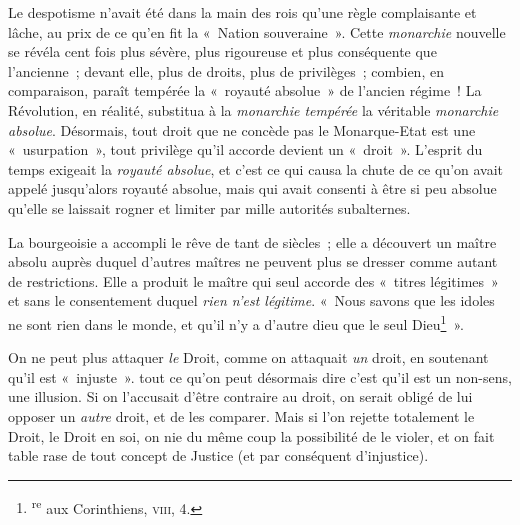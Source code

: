 \documentclass[french,twoside]{book} %
\begin{document}
Le despotisme n’avait été dans la main des rois qu’une règle complaisante et lâche, au prix de ce qu’en fit la « Nation souveraine ». Cette \emph{monarchie} nouvelle se révéla cent fois plus sévère, plus rigoureuse et plus conséquente que l’ancienne ; devant elle, plus de droits, plus de privilèges ; combien, en comparaison, paraît tempérée la « royauté absolue » de l’ancien régime ! La Révolution, en réalité, substitua à la \emph{monarchie tempérée} la véritable \emph{monarchie absolue}. Désormais, tout droit que ne concède pas le Monarque-Etat est une « usurpation », tout privilège qu’il accorde devient un « droit ». L’esprit du temps exigeait la \emph{royauté absolue}, et c’est ce qui causa la chute de ce qu’on avait appelé jusqu’alors royauté absolue, mais qui avait consenti à être si peu absolue qu’elle se laissait rogner et limiter par mille autorités subalternes.\par
La bourgeoisie a accompli le rêve de tant de siècles ; elle a découvert un maître absolu auprès duquel d’autres maîtres ne peuvent plus se dresser comme autant de restrictions. Elle a produit le maître qui seul accorde des « titres légitimes » et sans le consentement duquel \emph{rien n’est légitime}. « Nous savons que les idoles ne sont rien dans le monde, et qu’il n’y a d’autre dieu que le seul Dieu\footnote{ \textsuperscript{re} aux Corinthiens, {\scshape viii}, 4.
 } ».\par
 On ne peut plus attaquer \emph{le} Droit, comme on attaquait \emph{un} droit, en soutenant qu’il est « injuste ». tout ce qu’on peut désormais dire c’est qu’il est un non-sens, une illusion. Si on l’accusait d’être contraire au droit, on serait obligé de lui opposer un \emph{autre} droit, et de les comparer. Mais si l’on rejette totalement le Droit, le Droit en soi, on nie du même coup la possibilité de le violer, et on fait table rase de tout concept de Justice (et par conséquent d’injustice).\par
\end{document}
